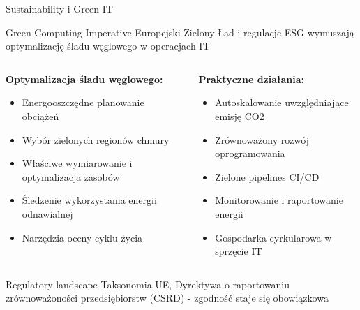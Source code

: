 \documentclass[10pt, aspectratio=169]{beamer}
\begin{document}
\begin{frame}{Sustainability i Green IT}
\begin{alertblock}{Green Computing Imperative}
Europejski Zielony Ład i regulacje ESG wymuszają optymalizację śladu węglowego w operacjach IT
\end{alertblock}

\begin{columns}[T]
\begin{column}{0.5\textwidth}
\textbf{Optymalizacja śladu węglowego:}
\begin{itemize}
\item Energooszczędne planowanie obciążeń
\item Wybór zielonych regionów chmury
\item Właściwe wymiarowanie i optymalizacja zasobów  
\item Śledzenie wykorzystania energii odnawialnej
\item Narzędzia oceny cyklu życia
\end{itemize}
\end{column}
\begin{column}{0.5\textwidth}
\textbf{Praktyczne działania:}
\begin{itemize}
\item Autoskalowanie uwzględniające emisję CO2
\item Zrównoważony rozwój oprogramowania
\item Zielone pipelines CI/CD
\item Monitorowanie i raportowanie energii
\item Gospodarka cyrkularowa w sprzęcie IT
\end{itemize}
\end{column}
\end{columns}

\begin{block}{Regulatory landscape}
Taksonomia UE, Dyrektywa o raportowaniu zrównoważoności przedsiębiorstw (CSRD) - zgodność staje się obowiązkowa
\end{block}
\end{frame}
\end{document}
